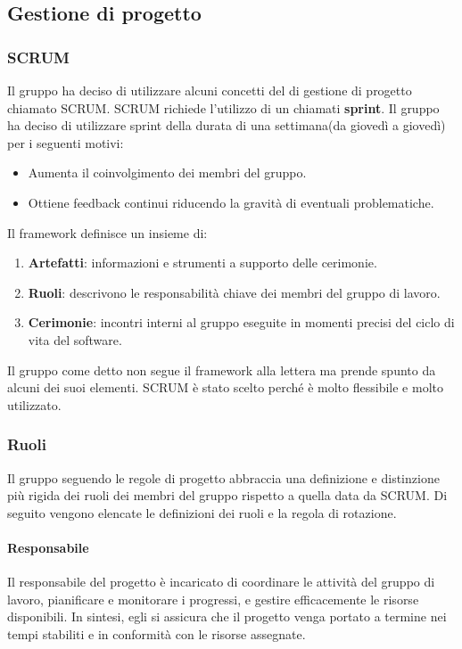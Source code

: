 \subsection{Gestione di progetto}
\label{subsec:gestione_progetto}

\subsubsection{SCRUM}
Il gruppo ha deciso di utilizzare alcuni concetti del  di gestione di progetto  chiamato SCRUM.
SCRUM richiede l'utilizzo di un  chiamati \textbf{sprint}.
Il gruppo ha deciso di utilizzare sprint della durata di una settimana(da giovedì a giovedì) per i seguenti motivi:
\begin{itemize}
    \item Aumenta il coinvolgimento dei membri del gruppo.
    \item Ottiene feedback continui riducendo la gravità di eventuali problematiche.
\end{itemize}
Il framework definisce un insieme di:
\begin{enumerate}
    \item \textbf{Artefatti}: informazioni e strumenti a supporto delle cerimonie.
   
    \item \textbf{Ruoli}: descrivono le responsabilità chiave dei membri del gruppo di lavoro.
    
    \item \textbf{Cerimonie}: incontri interni al gruppo eseguite in momenti precisi del ciclo di vita del software.
\end{enumerate}
Il gruppo come detto non segue il framework alla lettera ma prende spunto da alcuni dei suoi elementi.
SCRUM è stato scelto perché è molto flessibile e molto utilizzato. 

\subsubsection{Ruoli}
\label{subsubsec:ruoli}
Il gruppo seguendo le regole di progetto abbraccia una definizione e distinzione più rigida dei ruoli dei membri del gruppo rispetto a quella data da SCRUM.  
Di seguito vengono elencate le definizioni dei ruoli e la regola di rotazione.

\paragraph{Responsabile}
Il responsabile del progetto è incaricato di coordinare le attività del gruppo di lavoro, pianificare e monitorare i progressi, e gestire efficacemente le risorse disponibili. In sintesi, egli si assicura che il progetto venga portato a termine nei tempi stabiliti e in conformità con le risorse assegnate.


